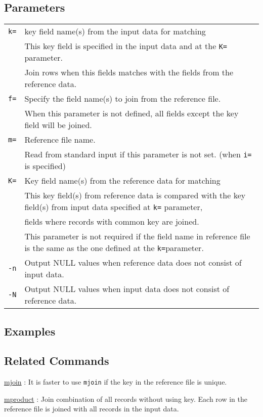 \subsection*{Parameters}
\begin{table}[htbp]
{\small
\begin{tabular}{ll}
\verb|k=|    & key field name(s) from the input data for matching \\
             & This key field is specified in the input data and at the \verb|K=| parameter.  \\
             & Join rows when this fields matches with the fields from the reference data. \\
\verb|f=|    & Specify the field name(s) to join from the reference file. \\
             & When this parameter is not defined, all fields except the key field will be joined. \\
\verb|m=|    & Reference file name. \\
             & Read from standard input if this parameter is not set. (when \verb|i=| is specified) \\
\verb|K=|    & Key field name(s) from the reference data for matching \\
             & This key field(s) from reference data is compared with the key field(s) from  input data specified at \verb|k=| parameter, \\
             & fields where records with common key are joined. \\
             & This parameter is not required if the field name in reference file is the same as the one defined at the \verb|k=|parameter. \\
\verb|-n|    & Output NULL values when reference data does not consist of input data. \\
\verb|-N|    & Output NULL values when input data does not consist of reference data. \\
\end{tabular} 
}
\end{table} 

\subsection*{Examples}

\subsection*{Related Commands}
\hyperref[sect:mjoin] {mjoin} :  It is faster to use \verb|mjoin| if the key in the reference file is unique. 

\hyperref[sect:mproduct] {mproduct} : Join combination of all records without using key. Each row in the reference file is joined with all records in the input data.

%
